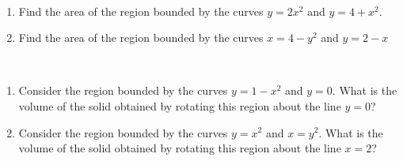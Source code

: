 \documentclass{article}[12pt]
\begin{document}
\begin{problem}~
\begin{enumerate}
\item Find the area of the region bounded by the curves $y = 2x^2$ and $y = 4 + x^2$.

\item Find the area of the region bounded by the curves $x = 4 - y^2$ and $y = 2 - x$

\end{enumerate}
\end{problem}

\begin{problem}~
\begin{enumerate}
\item Consider the region bounded by the curves $y = 1-x^2$ and $y =0$. What is the volume of the solid obtained by
rotating this region about the line $y = 0$?

\item Consider the region bounded by the curves $y = x^2$ and $x = y^2$. What is the volume of the solid obtained by
rotating this region about the line $x = 2$?

\end{enumerate}
\end{problem}
\end{document}
